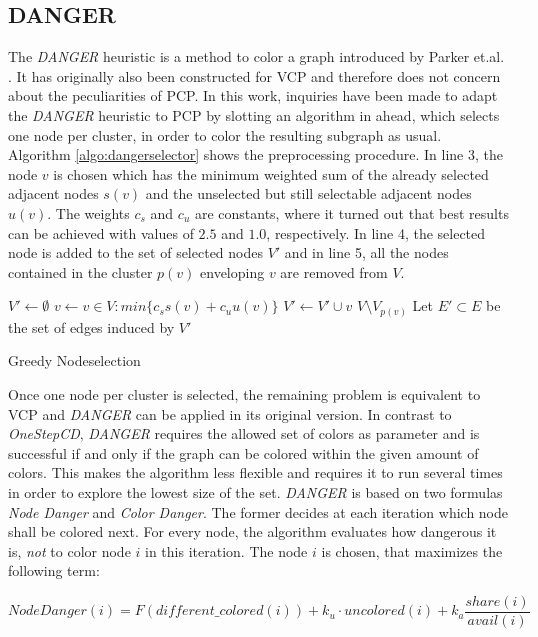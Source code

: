 \subsection{DANGER}
The \textit{DANGER} heuristic is a method to color a graph introduced by Parker et.al. \cite{glover-96}. It has originally also been constructed for VCP and therefore does not concern about the peculiarities of PCP. In this work, inquiries have been made to adapt the \textit{DANGER} heuristic to PCP by slotting an algorithm in ahead, which selects one node per cluster, in order to color the resulting subgraph as usual.\\ 
Algorithm \ref{algo:dangerselector} shows the preprocessing procedure. In line 3, the node $v$ is chosen which has the minimum weighted sum of the already selected adjacent nodes $s(v)$ and the unselected but still selectable adjacent nodes $u(v)$. The weights $c_s$ and $c_u$ are constants, where it turned out that best results can be achieved with values of $2.5$ and $1.0$, respectively. In line 4, the selected node is added to the set of selected nodes $V'$ and in line 5, all the nodes contained in the cluster $p(v)$ enveloping $v$ are removed from $V$. 

\begin{algorithm}[h]
$V' \gets \emptyset$\;
 {
        $v \gets v\in V : min\{ c_s s(v) + c_u u(v) \}$\;
        $V' \gets V' \cup v$\;
        $V \setminus V_{p(v)}$\;
}
Let $E'\subset E$ be the set of edges induced by $V'$\;
\caption{Greedy Nodeselection}
\label{algo:dangerselector}
\end{algorithm}


Once one node per cluster is selected, the remaining problem is equivalent to VCP and \textit{DANGER} can be applied in its original version. In contrast to \textit{OneStepCD}, \textit{DANGER} requires the allowed set of colors as parameter and is successful if and only if the graph can be colored within the given amount of colors. This makes the algorithm less flexible and requires it to run several times in order to explore the lowest size of the set. \textit{DANGER} is based on two formulas \textit{Node Danger} and \textit{Color Danger}.
The former decides at each iteration which node shall be colored next. For every node, the algorithm evaluates how dangerous it is, \textit{not} to color node $i$ in this iteration. The node $i$ is chosen, that maximizes the following term:

$$ \mathit{NodeDanger}(i) =  F(\mathit{different\_colored}(i)) + k_u \cdot \mathit{uncolored}(i) + k_a \frac{\mathit{share}(i)}{\mathit{avail}(i)} $$

